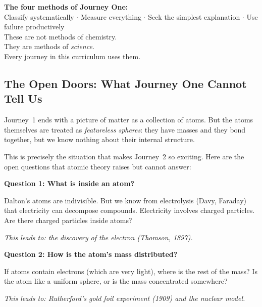 \documentclass[12pt, a4paper]{book}
\theoremstyle{definition}
\begin{document}
\begin{center}
\begin{tcolorbox}[
  enhanced, colback=SynthColor!5, colframe=SynthColor!60,
  width=0.85\textwidth, arc=3pt, fontupper=\sffamily
]
\centering
\textbf{The four methods of Journey One:}\\[6pt]
\small
Classify systematically $\cdot$
Measure everything $\cdot$
Seek the simplest explanation $\cdot$
Use failure productively\\[4pt]
\normalsize
These are not methods of chemistry.\\
They are methods of \emph{science}.\\
Every journey in this curriculum uses them.
\end{tcolorbox}
\end{center}

\subsection{The Open Doors: What Journey One Cannot Tell Us}

Journey~1 ends with a picture of matter as a collection of atoms.
But the atoms themselves are treated as \emph{featureless spheres}:
they have masses and they bond together, but we know nothing
about their internal structure.

This is precisely the situation that makes Journey~2 so exciting.
Here are the open questions that atomic theory raises
but cannot answer:

\begin{openquestion}
\textbf{Question 1: What is inside an atom?}

Dalton's atoms are indivisible. But we know from electrolysis
(Davy, Faraday) that electricity can decompose compounds.
Electricity involves charged particles.
Are there charged particles inside atoms?

\vspace{0.3em}
\textit{This leads to: the discovery of the electron (Thomson, 1897).}
\end{openquestion}

\begin{openquestion}
\textbf{Question 2: How is the atom's mass distributed?}

If atoms contain electrons (which are very light),
where is the rest of the mass?
Is the atom like a uniform sphere,
or is the mass concentrated somewhere?

\vspace{0.3em}
\textit{This leads to: Rutherford's gold foil experiment (1909)
and the nuclear model.}
\end{openquestion}
\end{document}
